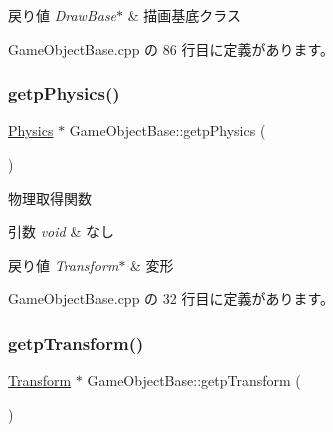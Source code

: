 \begin{DoxyRetVals}{戻り値}
{\em Draw\+Base$\ast$} & 描画基底クラス \\
\hline
\end{DoxyRetVals}


 Game\+Object\+Base.\+cpp の 86 行目に定義があります。

\mbox{\label{class_game_object_base_a0d3bc35686dcbf8a209017ec01708255}} 
\subsubsection{\texorpdfstring{getp\+Physics()}{getpPhysics()}}
{\footnotesize\ttfamily \mbox{\hyperlink{class_physics}{Physics}} $\ast$ Game\+Object\+Base\+::getp\+Physics (\begin{DoxyParamCaption}{ }\end{DoxyParamCaption})}



物理取得関数 


\begin{DoxyParams}{引数}
{\em void} & なし \\
\hline
\end{DoxyParams}

\begin{DoxyRetVals}{戻り値}
{\em Transform$\ast$} & 変形 \\
\hline
\end{DoxyRetVals}


 Game\+Object\+Base.\+cpp の 32 行目に定義があります。

\mbox{\label{class_game_object_base_ab2550083f7eed51fc77b3a86ddafd9fb}} 
\subsubsection{\texorpdfstring{getp\+Transform()}{getpTransform()}}
{\footnotesize\ttfamily \mbox{\hyperlink{class_transform}{Transform}} $\ast$ Game\+Object\+Base\+::getp\+Transform (\begin{DoxyParamCaption}{ }\end{DoxyParamCaption})}



